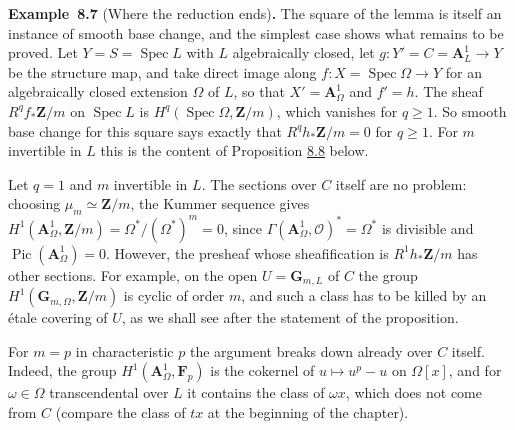 \documentclass[11pt]{article}
\newenvironment{bpstatement}[2]{\par\addvspace{0.6\baselineskip}\noindent\textbf{#1}#2\textbf{.}\enspace\ignorespaces}
  {\par\addvspace{0.4\baselineskip}}
\begin{document}
\label{bp29}%
\begin{bpstatement}{Example~8.7}{ (Where the reduction ends)}
The square of the lemma is itself an instance of smooth base change, and the simplest case shows what remains to be proved. Let \(Y=S=\operatorname{Spec}L\) with \(L\) algebraically closed, let \(g:Y'=C=\mathbf A^1_L\to Y\) be the structure map, and take direct image along \(f:X=\operatorname{Spec}\Omega\to Y\) for an algebraically closed extension \(\Omega\) of \(L\), so that \(X'=\mathbf A^1_\Omega\) and \(f'=h\). The sheaf \(R^qf_*\mathbf Z/m\) on \(\operatorname{Spec}L\) is \(H^q(\operatorname{Spec}\Omega,\mathbf Z/m)\), which vanishes for \(q\geq1\). So smooth base change for this square says exactly that \(R^qh_*\mathbf Z/m=0\) for \(q\geq1\). For \(m\) invertible in \(L\) this is the content of Proposition \hyperref[bp32]{8.8} below.

Let \(q=1\) and \(m\) invertible in \(L\). The sections over \(C\) itself are no problem: choosing \(\mu_m\simeq\mathbf Z/m\), the Kummer sequence gives \(H^1(\mathbf A^1_\Omega,\mathbf Z/m)=\Omega^*/(\Omega^*)^m=0\), since \(\Gamma(\mathbf A^1_\Omega,\mathcal O)^*=\Omega^*\) is divisible and \(\operatorname{Pic}(\mathbf A^1_\Omega)=0\). However, the presheaf whose sheafification is \(R^1h_*\mathbf Z/m\) has other sections. For example, on the open \(U=\mathbf G_{m,L}\) of \(C\) the group \(H^1(\mathbf G_{m,\Omega},\mathbf Z/m)\) is cyclic of order \(m\), and such a class has to be killed by an étale covering of \(U\), as we shall see after the statement of the proposition.

For \(m=p\) in characteristic \(p\) the argument breaks down already over \(C\) itself. Indeed, the group \(H^1(\mathbf A^1_\Omega,\mathbf F_p)\) is the cokernel of \(u\mapsto u^p-u\) on \(\Omega[x]\), and for \(\omega\in\Omega\) transcendental over \(L\) it contains the class of \(\omega x\), which does not come from \(C\) (compare the class of \(tx\) at the beginning of the chapter).
\end{bpstatement}


\end{document}

